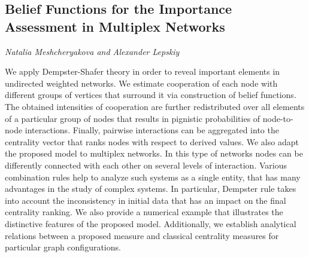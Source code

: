 \documentclass[../booklet.tex]{subfiles}
\begin{document}
\subsection[Belief Functions for the Importance Assessment in Multiplex Networks. {\it Natalia Meshcheryakova and Alexander Lepskiy}]{Belief Functions for the Importance Assessment in Multiplex Networks}
 

\begin{center}
  {\it Natalia Meshcheryakova and Alexander Lepskiy}
\end{center}



We apply Dempster-Shafer theory in order to reveal important elements in undirected weighted networks. We estimate cooperation of each node with different groups of vertices that surround it via construction of belief functions. The obtained intensities of cooperation are further redistributed over all elements of a particular group of nodes that results in pignistic probabilities of node-to-node interactions. Finally, pairwise interactions can be aggregated into the centrality vector that ranks nodes with respect to derived values. We also adapt the proposed model to multiplex networks. In this type of networks nodes can be differently connected with each other on several levels of interaction. Various combination rules help to analyze such systems as a single entity, that has many advantages in the study of complex systems. In particular, Dempster rule takes into account the inconsistency in initial data that has an impact on the final centrality ranking. We also provide a numerical example that illustrates the distinctive features of the proposed model. Additionally, we establish analytical relations between a proposed measure and classical centrality measures for particular graph configurations.

\end{document}
